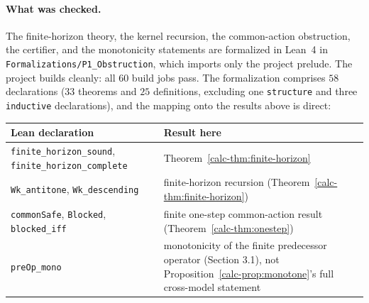 \documentclass[10pt,twocolumn]{article}
\theoremstyle{definition}
\begin{document}
\paragraph{What was checked.} The finite-horizon theory, the kernel recursion, the
common-action obstruction, the certifier, and the monotonicity statements are formalized in Lean~4 in \texttt{Formalizations/P1\_Obstruction}, which imports only the
project prelude. The project builds cleanly: all \(60\) build jobs pass. The formalization comprises \(58\) declarations (\(33\) theorems and \(25\) definitions, excluding one \texttt{structure} and three \texttt{inductive} declarations), and the mapping onto the results above is
direct:

\begin{center}
\begin{tabular}{@{}ll@{}}
\toprule
Lean declaration & Result here\\
\midrule
\texttt{finite\_horizon\_sound}, \texttt{finite\_horizon\_complete} & Theorem~\ref{calc-thm:finite-horizon}\\
\texttt{Wk\_antitone}, \texttt{Wk\_descending} & finite-horizon recursion (Theorem~\ref{calc-thm:finite-horizon})\\
\texttt{commonSafe}, \texttt{Blocked}, \texttt{blocked\_iff} & finite one-step common-action result (Theorem~\ref{calc-thm:onestep})\\
\texttt{preOp\_mono} & monotonicity of the finite predecessor operator (Section 3.1), not Proposition~\ref{calc-prop:monotone}'s full cross-model statement\\
\bottomrule
\end{tabular}
\end{center}
\end{document}
